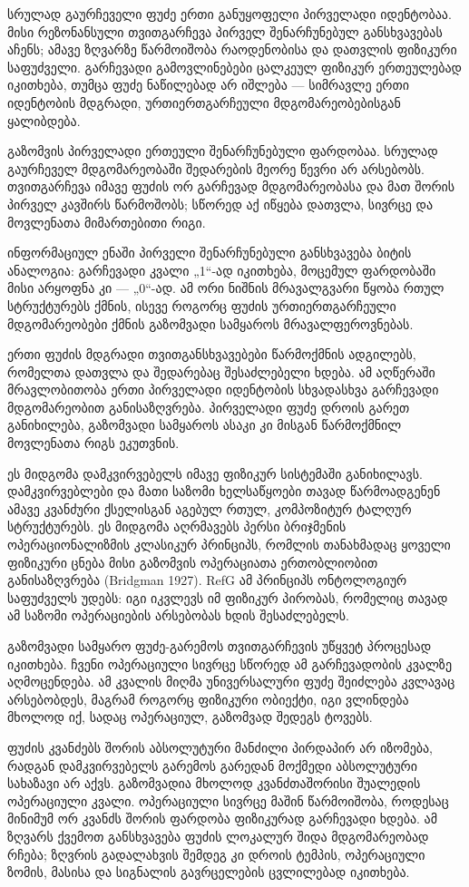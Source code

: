 \documentclass[11pt,a4paper]{article}
\begin{document}
სრულად გაურჩეველი ფუძე ერთი განუყოფელი პირველადი იდენტობაა. მისი რეზონანსული თვითგარჩევა პირველ შენარჩუნებულ განსხვავებას აჩენს; ამავე ზღვარზე წარმოიშობა რაოდენობისა და დათვლის ფიზიკური საფუძველი. გარჩევადი გამოვლინებები ცალკეულ ფიზიკურ ერთეულებად იკითხება, თუმცა ფუძე ნაწილებად არ იშლება — სიმრავლე ერთი იდენტობის მდგრადი, ურთიერთგარჩეული მდგომარეობებისგან ყალიბდება.

გაზომვის პირველადი ერთეული შენარჩუნებული ფარდობაა. სრულად გაურჩეველ მდგომარეობაში შედარების მეორე წევრი არ არსებობს. თვითგარჩევა იმავე ფუძის ორ გარჩევად მდგომარეობასა და მათ შორის პირველ კავშირს წარმოშობს; სწორედ აქ იწყება დათვლა, სივრცე და მოვლენათა მიმართებითი რიგი.

ინფორმაციულ ენაში პირველი შენარჩუნებული განსხვავება ბიტის ანალოგია: გარჩევადი კვალი „1“-ად იკითხება, მოცემულ ფარდობაში მისი არყოფნა კი — „0“-ად. ამ ორი ნიშნის მრავალგვარი წყობა რთულ სტრუქტურებს ქმნის, ისევე როგორც ფუძის ურთიერთგარჩეული მდგომარეობები ქმნის გაზომვადი სამყაროს მრავალფეროვნებას.

ერთი ფუძის მდგრადი თვითგანსხვავებები წარმოქმნის ადგილებს, რომელთა დათვლა და შედარებაც შესაძლებელი ხდება. ამ აღწერაში მრავლობითობა ერთი პირველადი იდენტობის სხვადასხვა გარჩევადი მდგომარეობით განისაზღვრება. პირველადი ფუძე დროის გარეთ განიხილება, გაზომვადი სამყაროს ასაკი კი მისგან წარმოქმნილ მოვლენათა რიგს ეკუთვნის.

ეს მიდგომა დამკვირვებელს იმავე ფიზიკურ სისტემაში განიხილავს. დამკვირვებლები და მათი საზომი ხელსაწყოები თავად წარმოადგენენ ამავე კვანძური ქსელისგან აგებულ რთულ, კომპოზიტურ ტალღურ სტრუქტურებს. ეს მიდგომა აღრმავებს პერსი ბრიჯმენის ოპერაციონალიზმის კლასიკურ პრინციპს, რომლის თანახმადაც ყოველი ფიზიკური ცნება მისი გაზომვის ოპერაციათა ერთობლიობით განისაზღვრება (Bridgman 1927). RefG ამ პრინციპს ონტოლოგიურ საფუძველს უდებს: იგი იკვლევს იმ ფიზიკურ პირობას, რომელიც თავად ამ საზომი ოპერაციების არსებობას ხდის შესაძლებელს.

გაზომვადი სამყარო ფუძე-გარემოს თვითგარჩევის უწყვეტ პროცესად იკითხება. ჩვენი ოპერაციული სივრცე სწორედ ამ გარჩევადობის კვალზე აღმოცენდება. ამ კვალის მიღმა უნივერსალური ფუძე შეიძლება კვლავაც არსებობდეს, მაგრამ როგორც ფიზიკური ობიექტი, იგი ვლინდება მხოლოდ იქ, სადაც ოპერაციულ, გაზომვად შედეგს ტოვებს.

ფუძის კვანძებს შორის აბსოლუტური მანძილი პირდაპირ არ იზომება, რადგან დამკვირვებელს გარემოს გარედან მოქმედი აბსოლუტური სახაზავი არ აქვს. გაზომვადია მხოლოდ კვანძთაშორისი შუალედის ოპერაციული კვალი. ოპერაციული სივრცე მაშინ წარმოიშობა, როდესაც მინიმუმ ორ კვანძს შორის ფარდობა ფიზიკურად გარჩევადი ხდება. ამ ზღვარს ქვემოთ განსხვავება ფუძის ლოკალურ შიდა მდგომარეობად რჩება; ზღვრის გადალახვის შემდეგ კი დროის ტემპის, ოპერაციული ზომის, მასისა და სიგნალის გავრცელების ცვლილებად იკითხება.
\end{document}
